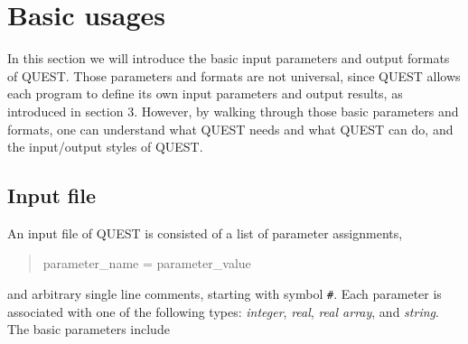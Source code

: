 \documentclass[12pt]{article}
\begin{document}
\section{Basic usages}
In this section we will introduce the basic input parameters and output formats of QUEST.
Those parameters and formats are not universal, since QUEST allows each program to define its own input parameters and output results, as introduced in section 3. However, by walking through those basic parameters and formats, one can understand what QUEST needs and what QUEST can do, and the input/output styles of QUEST.

\subsection{Input file}\label{sec config}
An input file of QUEST is consisted of a list of parameter assignments,
\begin{quote}
parameter\_name = parameter\_value
\end{quote}
and arbitrary single line comments, starting with symbol \verb"#".
Each parameter is associated with one of the following types: \emph{integer}, \emph{real}, \emph{real array}, and \emph{string}.
The basic parameters include
\end{document}
